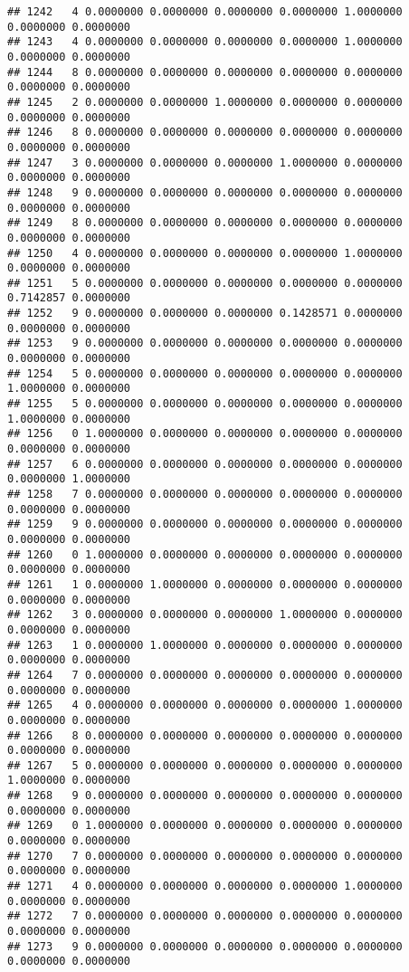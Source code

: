 \documentclass[
]{article}
\begin{document}
\begin{verbatim}
## 1242   4 0.0000000 0.0000000 0.0000000 0.0000000 1.0000000 0.0000000 0.0000000
## 1243   4 0.0000000 0.0000000 0.0000000 0.0000000 1.0000000 0.0000000 0.0000000
## 1244   8 0.0000000 0.0000000 0.0000000 0.0000000 0.0000000 0.0000000 0.0000000
## 1245   2 0.0000000 0.0000000 1.0000000 0.0000000 0.0000000 0.0000000 0.0000000
## 1246   8 0.0000000 0.0000000 0.0000000 0.0000000 0.0000000 0.0000000 0.0000000
## 1247   3 0.0000000 0.0000000 0.0000000 1.0000000 0.0000000 0.0000000 0.0000000
## 1248   9 0.0000000 0.0000000 0.0000000 0.0000000 0.0000000 0.0000000 0.0000000
## 1249   8 0.0000000 0.0000000 0.0000000 0.0000000 0.0000000 0.0000000 0.0000000
## 1250   4 0.0000000 0.0000000 0.0000000 0.0000000 1.0000000 0.0000000 0.0000000
## 1251   5 0.0000000 0.0000000 0.0000000 0.0000000 0.0000000 0.7142857 0.0000000
## 1252   9 0.0000000 0.0000000 0.0000000 0.1428571 0.0000000 0.0000000 0.0000000
## 1253   9 0.0000000 0.0000000 0.0000000 0.0000000 0.0000000 0.0000000 0.0000000
## 1254   5 0.0000000 0.0000000 0.0000000 0.0000000 0.0000000 1.0000000 0.0000000
## 1255   5 0.0000000 0.0000000 0.0000000 0.0000000 0.0000000 1.0000000 0.0000000
## 1256   0 1.0000000 0.0000000 0.0000000 0.0000000 0.0000000 0.0000000 0.0000000
## 1257   6 0.0000000 0.0000000 0.0000000 0.0000000 0.0000000 0.0000000 1.0000000
## 1258   7 0.0000000 0.0000000 0.0000000 0.0000000 0.0000000 0.0000000 0.0000000
## 1259   9 0.0000000 0.0000000 0.0000000 0.0000000 0.0000000 0.0000000 0.0000000
## 1260   0 1.0000000 0.0000000 0.0000000 0.0000000 0.0000000 0.0000000 0.0000000
## 1261   1 0.0000000 1.0000000 0.0000000 0.0000000 0.0000000 0.0000000 0.0000000
## 1262   3 0.0000000 0.0000000 0.0000000 1.0000000 0.0000000 0.0000000 0.0000000
## 1263   1 0.0000000 1.0000000 0.0000000 0.0000000 0.0000000 0.0000000 0.0000000
## 1264   7 0.0000000 0.0000000 0.0000000 0.0000000 0.0000000 0.0000000 0.0000000
## 1265   4 0.0000000 0.0000000 0.0000000 0.0000000 1.0000000 0.0000000 0.0000000
## 1266   8 0.0000000 0.0000000 0.0000000 0.0000000 0.0000000 0.0000000 0.0000000
## 1267   5 0.0000000 0.0000000 0.0000000 0.0000000 0.0000000 1.0000000 0.0000000
## 1268   9 0.0000000 0.0000000 0.0000000 0.0000000 0.0000000 0.0000000 0.0000000
## 1269   0 1.0000000 0.0000000 0.0000000 0.0000000 0.0000000 0.0000000 0.0000000
## 1270   7 0.0000000 0.0000000 0.0000000 0.0000000 0.0000000 0.0000000 0.0000000
## 1271   4 0.0000000 0.0000000 0.0000000 0.0000000 1.0000000 0.0000000 0.0000000
## 1272   7 0.0000000 0.0000000 0.0000000 0.0000000 0.0000000 0.0000000 0.0000000
## 1273   9 0.0000000 0.0000000 0.0000000 0.0000000 0.0000000 0.0000000 0.0000000

\end{verbatim}
\end{document}
